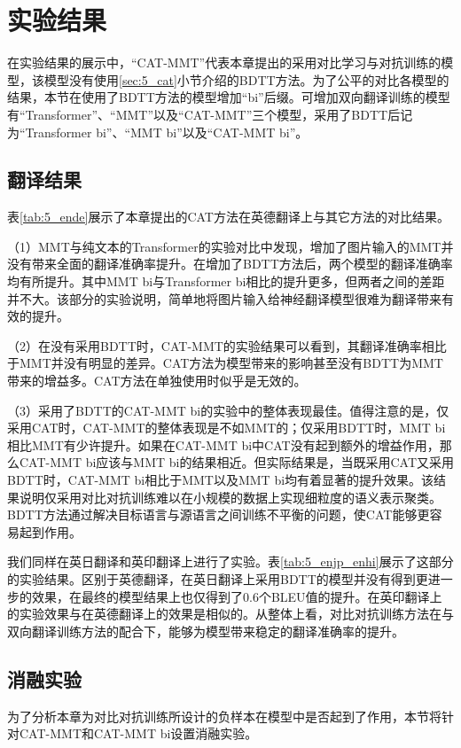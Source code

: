 \section{实验结果}

在实验结果的展示中，“CAT-MMT”代表本章提出的采用对比学习与对抗训练的模型，该模型没有使用\ref{sec:5_cat}小节介绍的BDTT方法。为了公平的对比各模型的结果，本节在使用了BDTT方法的模型增加“bi”后缀。可增加双向翻译训练的模型有“Transformer”、“MMT”以及“CAT-MMT”三个模型，采用了BDTT后记为“Transformer bi”、“MMT bi”以及“CAT-MMT bi”。

\subsection{翻译结果}
\label{sec:5_translation_results}

表\ref{tab:5_ende}展示了本章提出的CAT方法在英德翻译上与其它方法的对比结果。

（1）MMT与纯文本的Transformer的实验对比中发现，增加了图片输入的MMT并没有带来全面的翻译准确率提升。在增加了BDTT方法后，两个模型的翻译准确率均有所提升。其中MMT bi与Transformer bi相比的提升更多，但两者之间的差距并不大。该部分的实验说明，简单地将图片输入给神经翻译模型很难为翻译带来有效的提升。

（2）在没有采用BDTT时，CAT-MMT的实验结果可以看到，其翻译准确率相比于MMT并没有明显的差异。CAT方法为模型带来的影响甚至没有BDTT为MMT带来的增益多。CAT方法在单独使用时似乎是无效的。

（3）采用了BDTT的CAT-MMT bi的实验中的整体表现最佳。值得注意的是，仅采用CAT时，CAT-MMT的整体表现是不如MMT的；仅采用BDTT时，MMT bi相比MMT有少许提升。如果在CAT-MMT bi中CAT没有起到额外的增益作用，那么CAT-MMT bi应该与MMT bi的结果相近。但实际结果是，当既采用CAT又采用BDTT时，CAT-MMT bi相比于MMT以及MMT bi均有着显著的提升效果。该结果说明仅采用对比对抗训练难以在小规模的数据上实现细粒度的语义表示聚类。BDTT方法通过解决目标语言与源语言之间训练不平衡的问题，使CAT能够更容易起到作用。


我们同样在英日翻译和英印翻译上进行了实验。表\ref{tab:5_enjp_enhi}展示了这部分的实验结果。区别于英德翻译，在英日翻译上采用BDTT的模型并没有得到更进一步的效果，在最终的模型结果上也仅得到了0.6个BLEU值的提升。在英印翻译上的实验效果与在英德翻译上的效果是相似的。从整体上看，对比对抗训练方法在与双向翻译训练方法的配合下，能够为模型带来稳定的翻译准确率的提升。

\subsection{消融实验}
\label{sec:5_ablation_study}

为了分析本章为对比对抗训练所设计的负样本在模型中是否起到了作用，本节将针对CAT-MMT和CAT-MMT bi设置消融实验。

